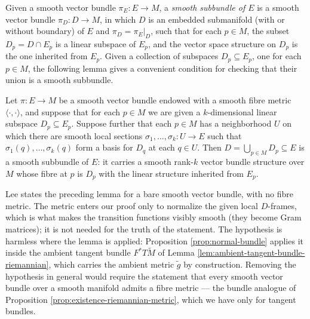Given a smooth vector bundle $\pi_E: E \to M$, a \textit{smooth subbundle of $E$} is a smooth vector bundle $\pi_D: D \to M$, in which $D$ is an embedded submanifold (with or without boundary) of $E$ and $\pi_D = \pi_E|_D$, such that for each $p \in M$, the subset $D_p = D \cap E_p$ is a linear subspace of $E_p$, and the vector space structure on $D_p$ is the one inherited from $E_p$. Given a collection of subspaces $D_p \subseteq E_p$, one for each $p \in M$, the following lemma gives a convenient condition for checking that their union is a smooth subbundle.

\begin{lemma}
\label{lem:local-frame-criterion-for-subbundles}
\leanok
{}
Let $\pi: E \to M$ be a smooth vector bundle endowed with a smooth fibre metric $\langle\cdot,\cdot\rangle$, and suppose that for each $p \in M$ we are given a $k$-dimensional linear subspace $D_p \subseteq E_p$. Suppose further that each $p \in M$ has a neighborhood $U$ on which there are smooth local sections $\sigma_1, \ldots, \sigma_k: U \to E$ such that $\sigma_1(q), \ldots, \sigma_k(q)$ form a basis for $D_q$ at each $q \in U$. Then $D = \bigcup_{p \in M} D_p \subseteq E$ is a smooth subbundle of $E$: it carries a smooth rank-$k$ vector bundle structure over $M$ whose fibre at $p$ is $D_p$ with the linear structure inherited from $E_p$.
\end{lemma}

\begin{remark}
\label{rem:subbundle-criterion-metric}
Lee states the preceding lemma for a bare smooth vector bundle, with no fibre metric. The metric enters our proof only to normalize the given local $D$-frames, which is what makes the transition functions visibly smooth (they become Gram matrices); it is not needed for the truth of the statement. The hypothesis is harmless where the lemma is applied: Proposition \ref{prop:normal-bundle} applies it inside the ambient tangent bundle $F^*T\tilde M$ of Lemma \ref{lem:ambient-tangent-bundle-riemannian}, which carries the ambient metric $\tilde g$ by construction. Removing the hypothesis in general would require the statement that every smooth vector bundle over a smooth manifold admits a fibre metric --- the bundle analogue of Proposition \ref{prop:existence-riemannian-metric}, which we have only for tangent bundles.
\end{remark}

